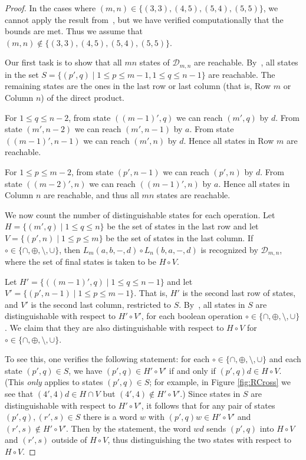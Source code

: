 \documentclass[final]{dmtcs-episciences}
\renewcommand{\le}{\leqslant}
\newcommand{\cD}{{\mathcal D}}
\theoremstyle{definition}
\theoremstyle{remark}
\begin{document}
\begin{proof}
In the cases where $(m,n) \in \{(3,3),(4,5),(5,4),(5,5)\}$, we cannot 
apply the result from~\cite[Theorem 1]{BBMR14}, but we have verified computationally that the bounds are met. Thus we assume that $(m,n) \not\in \{(3,3),(4,5),(5,4),(5,5)\}$.

Our first task is to show that all $mn$ states of $\cD_{m,n}$ are reachable.
By~\cite[Theorem 1]{BBMR14}, all states in the set $S = \{(p',q) \mid 1 \le p \le m-1, 1 \le q \le n-1\}$ are reachable. The remaining states are the ones in the last row or last column (that is, Row $m$ or Column $n$) of the direct product.

For $1 \le q \le n-2$, from state $((m-1)',q)$ we can reach $(m',q)$ by $d$. From state $(m',n-2)$ we can reach $(m',n-1)$ by $a$. From state $((m-1)',n-1)$ we can reach $(m',n)$ by $d$. Hence all states in Row $m$ are reachable.

For $1 \le p \le m-2$, from state $(p',n-1)$ we can reach $(p',n)$ by $d$. From state $((m-2)',n)$ we can reach $((m-1)',n)$ by $a$. Hence all states in Column $n$ are reachable, and thus all $mn$ states are reachable.

We now count the number of distinguishable states for each operation. Let $H = \{(m',q) \mid 1 \le q \le n\}$ be the set of states in the last row and let $V = \{(p',n) \mid 1 \le p \le m\}$ be the set of states in the last column. If $\circ \in \{\cap,\oplus,\setminus,\cup\}$, then $L_m(a,b,-,d) \circ L_n(b,a,-,d)$ is recognized by $\cD_{m,n}$, where the set of final states is taken to be $H \circ V$.

Let $H' = \{((m-1)',q) \mid 1 \le q \le n-1\}$ and let $V' = \{(p',n-1) \mid 1 \le p \le m-1\}$.
That is, $H'$ is the second last row of states, and $V'$ is the second last column, restricted to $S$. 
By~\cite[Theorem 1]{BBMR14}, all states in $S$ are distinguishable with respect to $H' \circ V'$, for each boolean operation $\circ \in \{\cap,\oplus,\setminus,\cup\}$.
We claim that they are also distinguishable with respect to $H \circ V$ for $\circ \in \{\cap,\oplus,\setminus,\cup\}$.

To see this, one verifies the following statement: for each $\circ \in \{\cap,\oplus,\setminus,\cup\}$ and each state $(p',q) \in S$, we have $(p',q) \in H' \circ V'$ if and only if $(p',q)d \in H \circ V$. (This \emph{only} applies to states $(p',q) \in S$; for example, in Figure \ref{fig:RCross} we see that $(4',4)d \in H \cap V$ but $(4',4) \not \in  H' \circ V'$.) Since states in $S$ are distinguishable with respect to $ H' \circ V'$, it follows that for any pair of states $(p',q),(r',s) \in S$ there is a word $w$ with $(p',q)w \in H' \circ V'$ and $(r',s) \not\in  H' \circ V'$. Then by the statement, the word $wd$ sends $(p',q)$ into $H \circ V$ and $(r',s)$ outside of $H \circ V$, thus distinguishing the two states with respect to $H \circ V$.



\end{proof}
\end{document}
